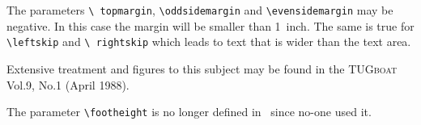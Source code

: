  The parameters \texttt{\textbackslash 
topmargin}, \texttt{\textbackslash oddsidemargin} and 
\texttt{\textbackslash evensidemargin} may be negative.  In this case 
the margin will be smaller than 1~inch.  The same is true for 
\texttt{\textbackslash leftskip} and \texttt{\textbackslash 
rightskip} which leads to text that is wider than the text area.

Extensive treatment and figures to this subject may be found in the
\textsc{TUGboat} Vol.9, No.1 (April 1988).

The parameter \texttt{\textbackslash footheight} is no longer defined 
in \LaTeXe\ since no-one used it.



\begin{fullpage}


\newcommand{\X}[1]{{#1}\index{{#1}}}
\newcount\T      %


\newcommand{\NAMEBOX}[8]{\put(#1,#2){\begin{picture}(0,0)(-#3,-#4)\ignorespaces
    \framebox(#5,#6)[#7]{#8}\end{picture}}}

\newcommand{\HARROW}[8]{\put(#1,#2){\begin{picture}(0,0)(-#3,-#4)\ignorespaces
    \put(0,0){\vector(1,0){#5}}\ignorespaces
    \put(#5,0){\vector(-1,0){#5}}\ignorespaces
    \ifthenelse{\equal{#6}{b}}{\ignorespaces
      \put(0,-\TAD){\makebox(#5,0)[#7]{#8}}
    }{\ignorespaces
    \ifthenelse{\equal{#6}{t}}{}{\ignorespaces
      \typeout{Side #6 must be ``b'' or ``t''--``t'' assumed}}\ignorespaces
      \put(0,\TAD){\makebox(#5,0)[#7]{#8}}
    }
    \end{picture}}}


\end{fullpage}
